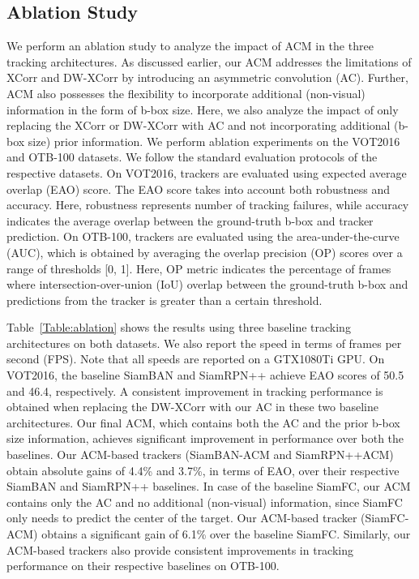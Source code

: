 \documentclass[10pt,twocolumn,letterpaper,final]{cvpr}
\begin{document}
\subsection{Ablation Study}
We perform an ablation study to analyze the impact of ACM in the
three tracking architectures. As discussed earlier, our ACM addresses the limitations of XCorr and DW-XCorr by introducing an asymmetric convolution (AC). Further, ACM also possesses the flexibility to incorporate additional (non-visual) information in the form of b-box size. Here, we also analyze the impact of only replacing  the XCorr or DW-XCorr with AC and not incorporating additional (b-box size) prior information. 
We perform ablation experiments on the VOT2016 and OTB-100 datasets. We follow the standard evaluation protocols of the respective datasets. On VOT2016, trackers are evaluated using expected average overlap
(EAO) score. The EAO score takes into account both robustness and accuracy. Here, robustness represents number of tracking failures, while accuracy indicates the average overlap between the ground-truth b-box and tracker prediction. On OTB-100, trackers are evaluated using the area-under-the-curve (AUC), which is obtained by averaging the overlap precision (OP) scores over a range of thresholds [0, 1]. Here, OP metric indicates the percentage of frames where intersection-over-union (IoU)
overlap between the ground-truth b-box and predictions from the tracker is greater than a certain threshold. 

Table~\ref{Table:ablation} shows the results using three baseline tracking architectures on both datasets. We also report the speed in terms of frames per second (FPS). Note that all speeds are reported on a GTX1080Ti GPU. On VOT2016, the baseline SiamBAN and SiamRPN++ achieve EAO scores of 50.5 and 46.4, respectively. A consistent improvement in tracking performance is obtained when replacing the DW-XCorr with our AC in these two baseline architectures. Our final ACM, which contains both the AC and the prior b-box size information, achieves significant improvement in performance over both the baselines. Our ACM-based trackers (SiamBAN-ACM and SiamRPN++ACM) obtain absolute gains of 4.4\% and 3.7\%, in terms of EAO, over their respective SiamBAN and SiamRPN++ baselines. In case of the baseline SiamFC, our ACM contains only the AC and no additional (non-visual) information, since SiamFC only needs to predict the center of the target. Our ACM-based tracker (SiamFC-ACM) obtains a significant gain of 6.1\% over the baseline SiamFC. Similarly, our ACM-based trackers also provide consistent improvements in tracking performance on their respective baselines on OTB-100. 
\end{document}
